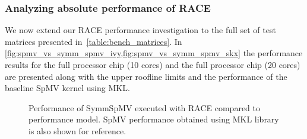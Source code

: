 \subsubsection{Analyzing absolute performance of RACE}
%
We now extend our \acrshort{RACE}  performance investigation to the full set of test matrices presented in~\cref{table:bench_matrices}. In \cref{fig:spmv_vs_symm_spmv_ivy,fig:spmv_vs_symm_spmv_skx} the performance results for the full \IVB processor chip (10 cores) and the full \SKX processor chip (20 cores) are presented along with the upper roofline limits and the performance of the baseline \acrshort{SpMV} kernel using \acrshort{MKL}.  
 \begin{figure}[thbp]
	\centering
	\hspace{1em}
	\caption{Performance of \acrshort{SymmSpMV} executed with \acrshort{RACE} compared to performance model. \acrshort{SpMV} performance obtained using \acrshort{MKL} library is also shown for reference.}
	\label{fig:SpMV_vs_SymmSpMV}
\end{figure}
